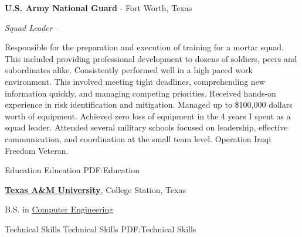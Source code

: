 \documentclass[letterpaper,MMMyyyy,nonstopmode]{simpleresumecv}
\begin{document}
\begin{Body}
    \vspace{3mm} %

    {\textbf{U.S. Army National Guard}}
    - Fort Worth, Texas

        {\textit{Squad Leader}}
    \hfill
     --
    \begin{Detail}
        \BulletItem
        Responsible for the preparation and execution of training for a mortar squad. This included providing professional development to dozens of soldiers, peers and subordinates alike.
        \vspace{1mm} %
        \BulletItem
        Consistently performed well in a high paced work environment. This involved meeting tight deadlines, comprehending new information quickly, and managing competing priorities.
        \vspace{1mm} %
        \BulletItem
        Received hands-on experience in risk identification and mitigation.
        \vspace{1mm} %
        \BulletItem
        Managed up to \$100,000 dollars worth of equipment. Achieved zero loss of equipment in the 4 years I spent as a squad leader.
        \vspace{1mm} %
        \BulletItem
        Attended several military schools focused on leadership, effective communication, and coordination at the small team level.
        \vspace{1mm} %
        \BulletItem
        Operation Iraqi Freedom Veteran.
    \end{Detail}
    \BigGap

    \vspace{3mm} %

    \Section
    {Education}
    {Education}
    {PDF:Education}

    \Entry
    \href{http://www.tamu.edu}
    {\textbf{Texas A\&M University}},
    College Station, Texas

    B.S. in
    \href{https://engineering.tamu.edu/cse/index.html}
    {Computer Engineering}
    \hfill


    \Section
    {Technical Skills}
    {Technical Skills}
    {PDF:Technical Skills}


\end{Body}
\end{document}
